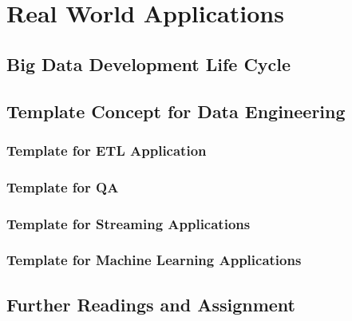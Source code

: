 \section{Real World Applications}
\subsection{Big Data Development Life Cycle}
\subsection{Template Concept for Data Engineering}
\subsubsection{Template for ETL Application}
\subsubsection{Template for QA}
\subsubsection{Template for Streaming Applications}
\subsubsection{Template for Machine Learning Applications}
\subsection{Further Readings and Assignment}